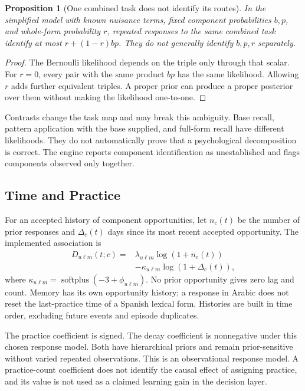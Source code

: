 \documentclass{article}
\newtheorem{proposition}{Proposition}
\begin{document}
\begin{proposition}[One combined task does not identify its routes]
In the simplified model with known nuisance terms, fixed component
probabilities \(b,p\), and whole-form probability \(r\), repeated responses
to the same combined task identify at most
\(r+(1-r)bp\). They do not generally identify \(b,p,r\) separately.
\end{proposition}
\begin{proof}
The Bernoulli likelihood depends on the triple only through that scalar.
For \(r=0\), every pair with the same product \(bp\) has the same likelihood.
Allowing \(r\) adds further equivalent triples. A proper prior can produce
a proper posterior over them without making the likelihood one-to-one.
\end{proof}

Contrasts change the task map and may break this ambiguity. Base recall,
pattern application with the base supplied, and full-form recall have
different likelihoods. They do not automatically prove that a psychological
decomposition is correct. The engine reports component identification as
unestablished and flags components observed only together.

\subsection{Time and Practice}

For an accepted history of component opportunities, let \(n_c(t)\) be the
number of prior responses and \(\Delta_c(t)\) days since its most recent
accepted opportunity. The implemented association is
\begin{equation}
\begin{split}
 D_{u\ell m}(t;c)={}&
 \lambda_{u\ell m}\log(1+n_c(t))\\
 &-\kappa_{u\ell m}\log(1+\Delta_c(t)),
\end{split}
\label{eq:time}
\end{equation}
where \(\kappa_{u\ell m}=\operatorname{softplus}(-3+\phi_{u\ell m})\).
No prior opportunity gives zero lag and count. Memory has its own opportunity
history; a response in Arabic does not reset the last-practice time of a
Spanish lexical form. Histories are built in time order, excluding future
events and episode duplicates.

The practice coefficient is signed. The decay coefficient is nonnegative
under this chosen response model. Both have hierarchical priors and remain
prior-sensitive without varied repeated observations. This is an observational
response model. A practice-count coefficient does not identify the causal
effect of assigning practice, and its value is not used as a claimed learning
gain in the decision layer.
\end{document}
